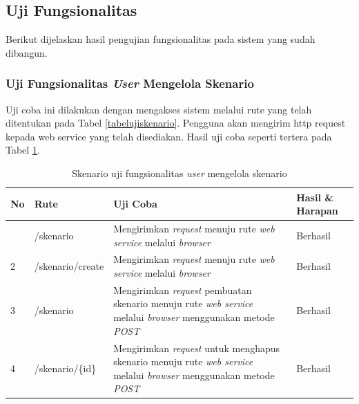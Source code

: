 		\subsection{Uji Fungsionalitas}
			Berikut dijelaskan hasil pengujian fungsionalitas pada sistem yang sudah dibangun.
			
			\subsubsection{Uji Fungsionalitas \textit{User} Mengelola Skenario}
				Uji coba ini dilakukan dengan mengakses sistem melalui rute yang telah ditentukan pada Tabel \ref{tabelujiskenario}. Pengguna akan mengirim http request kepada web service yang telah
				disediakan. Hasil uji coba seperti tertera pada Tabel \ref{tabelhasilujiskenario}.
				\begin{longtable}{|p{}|p{}|p{0.30\textwidth}|p{}|}
					\caption{Skenario uji fungsionalitas \textit{user} mengelola skenario} \label{tabelhasilujiskenario} \\ \hline
					\textbf{No} & \textbf{Rute} & \textbf{Uji Coba} & \textbf{Hasil \& Harapan} \\ \hline
					\endhead
					\endfoot
					\endlastfoot
					1 & /skenario & Mengirimkan \textit{request} menuju rute \textit{web service} melalui \textit{browser} & Berhasil \\ \hline
					2 & /skenario/create & Mengirimkan \textit{request} menuju rute \textit{web service} melalui \textit{browser} & Berhasil \\ \hline
					3 & /skenario & Mengirimkan \textit{request} pembuatan skenario menuju rute \textit{web service} melalui \textit{browser} menggunakan metode \textit{POST} & Berhasil \\ \hline
					4 & /skenario/\{id\} & Mengirimkan \textit{request} untuk menghapus skenario menuju rute \textit{web service} melalui \textit{browser} menggunakan metode \textit{POST} & Berhasil \\ \hline
				\end{longtable}
				
